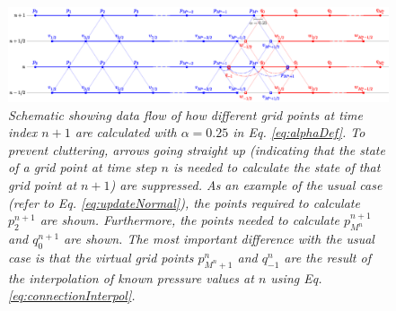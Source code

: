 \begin{figure}[t]
    \centering
    \includegraphics[width = \textwidth]{Figures/tromboneSchematic.eps}
    \caption{\it Schematic showing data flow of how different grid points at time index $n+1$ are calculated with $\alpha = 0.25$ in Eq. \eqref{eq:alphaDef}. To prevent cluttering, arrows going straight up (indicating that the state of a grid point at time step $n$ is needed to calculate the state of that grid point at $n+1$) are suppressed. As an example of the usual case (refer to Eq. \eqref{eq:updateNormal}), the points required to calculate $p_2^{n+1}$ are shown. Furthermore, the points needed to calculate $p_{M^n}^{n+1}$ and $q_0^{n+1}$ are shown. The most important difference with the usual case is that the virtual grid points $p_{M^n+1}^n$ and $q_{-1}^n$ 
    are the result of the interpolation of known pressure values at $n$ using Eq. \eqref{eq:connectionInterpol}. %
    \label{fig:dynamicGridSchematic}}
\end{figure}

